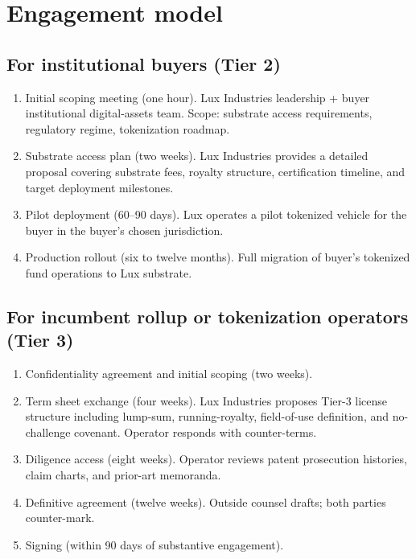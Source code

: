\documentclass[11pt,letterpaper]{article}
\begin{document}
\section{Engagement model}

\subsection{For institutional buyers (Tier 2)}

\begin{enumerate}[label=\textbf{Step \arabic*.}]
\item Initial scoping meeting (one hour). Lux Industries leadership + buyer institutional digital-assets team. Scope: substrate access requirements, regulatory regime, tokenization roadmap.
\item Substrate access plan (two weeks). Lux Industries provides a detailed proposal covering substrate fees, royalty structure, certification timeline, and target deployment milestones.
\item Pilot deployment (60--90 days). Lux operates a pilot tokenized vehicle for the buyer in the buyer's chosen jurisdiction.
\item Production rollout (six to twelve months). Full migration of buyer's tokenized fund operations to Lux substrate.
\end{enumerate}

\subsection{For incumbent rollup or tokenization operators (Tier 3)}

\begin{enumerate}[label=\textbf{Step \arabic*.}]
\item Confidentiality agreement and initial scoping (two weeks).
\item Term sheet exchange (four weeks). Lux Industries proposes Tier-3 license structure including lump-sum, running-royalty, field-of-use definition, and no-challenge covenant. Operator responds with counter-terms.
\item Diligence access (eight weeks). Operator reviews patent prosecution histories, claim charts, and prior-art memoranda.
\item Definitive agreement (twelve weeks). Outside counsel drafts; both parties counter-mark.
\item Signing (within 90 days of substantive engagement).
\end{enumerate}
\end{document}
